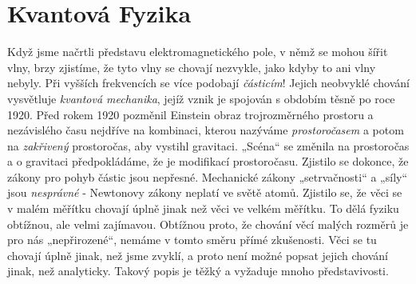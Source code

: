   \section{Kvantová Fyzika}
    Když jsme načrtli představu elektromagnetického pole, v němž se mohou šířit vlny, brzy zjistíme, že tyto 
    vlny se chovají nezvykle, jako kdyby to ani vlny nebyly. Při vyšších frekvencích se více podobají 
    \emph{částicím}! Jejich neobvyklé chování vysvětluje \emph{kvantová mechanika}, jejíž vznik je spojován s 
    obdobím těsně po roce 1920. Před rokem 1920 pozměnil Einstein obraz trojrozměrného prostoru a nezávislého 
    času nejdříve na kombinaci, kterou nazýváme \emph{prostoročasem} a potom na \emph{zakřivený} prostoročas, 
    aby vystihl gravitaci. „Scéna“ se změnila na prostoročas a o gravitaci předpokládáme, že je modifikací 
    prostoročasu. Zjistilo se dokonce, že zákony pro pohyb částic jsou nepřesné. Mechanické zákony 
    „setrvačnosti“ a „síly“ jsou \emph{nesprávné} - Newtonovy zákony neplatí ve světě atomů. Zjistilo se, že 
    věci se v malém měřítku chovají úplně jinak než věci ve velkém měřítku. To dělá fyziku obtížnou, ale 
    velmi zajímavou. Obtížnou proto, že chování věcí malých rozměrů je pro nás „nepřirozené“, nemáme v tomto 
    směru přímé zkušenosti. Věci se tu chovají úplně jinak, než jsme zvyklí, a proto není možné popsat jejich 
    chování jinak, než analyticky. Takový popis je těžký a vyžaduje mnoho představivosti.
    
